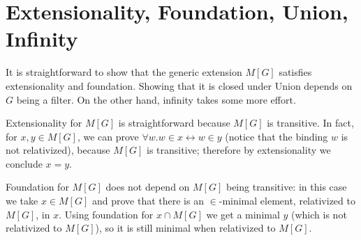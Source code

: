 \section{Extensionality, Foundation, Union, Infinity}
\label{sec:easy-axioms}
\newcommand{\quantRel}[3]{#1 #2\kern -1pt[#3]}
\newcommand{\forallRel}[2]{\quantRel{\forall}{#1}{#2}}
\newcommand{\existsRel}[2]{\quantRel{\exists}{#1}{#2}}

It is straightforward to show that the generic extension $M[G]$
satisfies extensionality and foundation. Showing that it is closed
under Union depends on $G$ being a filter. On the other hand, infinity
takes some more effort.


Extensionality for $M[G]$ is straightforward because $M[G]$ is
transitive. %
In fact, for $x,y\in M[G]$, we can prove
$\forall w. w\in x \leftrightarrow w\in y$ (notice that the binding
$w$ is not relativized), because $M[G]$ is transitive; therefore by
extensionality we conclude $x=y$.

Foundation for $M[G]$ does not depend on $M[G]$ being transitive: in
this case we take $x\in M[G]$ and prove that there is an
$\in$\kern -1pt-minimal element, relativized to $M[G]$, in $x$. Using
foundation for $x\cap M[G]$ we get a minimal $y$ (which is not
relativized to $M[G]$), so it is still minimal when relativized to
$M[G]$.

